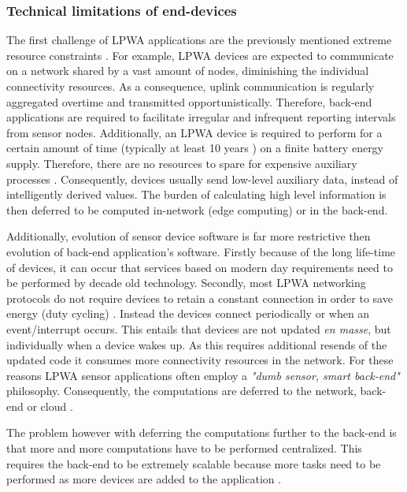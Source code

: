 \subsubsection{Technical limitations of end-devices}
The first challenge of LPWA applications are the previously mentioned extreme resource constraints \cite{key_features, value_of}. For example, LPWA devices are expected to communicate on a network shared by a vast amount of nodes, diminishing the individual connectivity resources. As a consequence, uplink communication is regularly aggregated overtime and transmitted opportunistically. Therefore, back-end applications are required to facilitate irregular and infrequent reporting intervals from sensor nodes. Additionally, an LPWA device is required to perform for a certain amount of time (typically at least 10 years \cite{tmobile, vodafone, nbiot_vs_lora}) on a finite battery energy supply. Therefore, there are no resources to spare for expensive auxiliary processes \cite{energy_challenges}. Consequently, devices usually send low-level auxiliary data, instead of intelligently derived values. The burden of calculating high level information is then deferred to be computed in-network (edge computing) or in the back-end. 

Additionally, evolution of sensor device software is far more restrictive then evolution of back-end application's software. Firstly because of the long life-time of devices, it can occur that services based on modern day requirements need to be performed by decade old technology. Secondly, most LPWA networking protocols do not require devices to retain a constant connection in order to save energy (duty cycling) \cite{tmobile, vodafone, on_duty_cycling, energy_challenges}. Instead the devices connect periodically or when an event/interrupt occurs. This entails that devices are not updated \emph{en masse}, but individually when a device wakes up. As this requires additional resends of the updated code it consumes more connectivity resources in the network. For these reasons LPWA sensor applications often employ a \emph{"dumb sensor, smart back-end"} philosophy. Consequently, the computations are deferred to the network, back-end or cloud \cite{popularity_applications_qos_moeilijk, defer_cloud}.

The problem however with deferring the computations further to the back-end is that more and more computations have to be performed centralized. This requires the back-end to be extremely scalable because more tasks need to be performed as more devices are added to the application \cite{stream_requirements, iot_big_data_difficulties, qos_tradeoff}.

